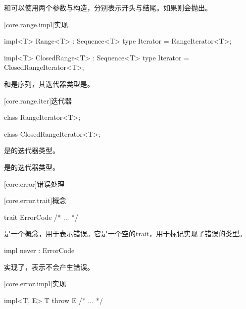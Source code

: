 \pnum
{}和可以使用两个参数与构造，分别表示开头与结尾。如果则会抛出。

[core.range.impl]{实现}

\begin{itemdecl}
impl<T> Range<T> : Sequence<T> {
    type Iterator = RangeIterator<T>;
}
\end{itemdecl}

\begin{itemdecl}
impl<T> ClosedRange<T> : Sequence<T> {
    type Iterator = ClosedRangeIterator<T>;
}
\end{itemdecl}

\pnum
{}和是序列，其迭代器类型是。

[core.range.iter]{迭代器}

\begin{itemdecl}
class RangeIterator<T>;
\end{itemdecl}

\begin{itemdecl}
class ClosedRangeIterator<T>;
\end{itemdecl}

\pnum
{}是的迭代器类型。

\pnum
{}是的迭代器类型。

[core.error]{错误处理}

[core.error.trait]{概念}

\begin{itemdecl}
trait ErrorCode { /* ... */ }
\end{itemdecl}

\pnum
{}是一个概念，用于表示错误。它是一个空的trait，用于标记实现了错误的类型。

\begin{itemdecl}
impl never : ErrorCode { }
\end{itemdecl}

\pnum
{}实现了，表示不会产生错误。

[core.error.impl]{实现}

\begin{itemdecl}
impl<T, E> T throw E { /* ... */ }
\end{itemdecl}

